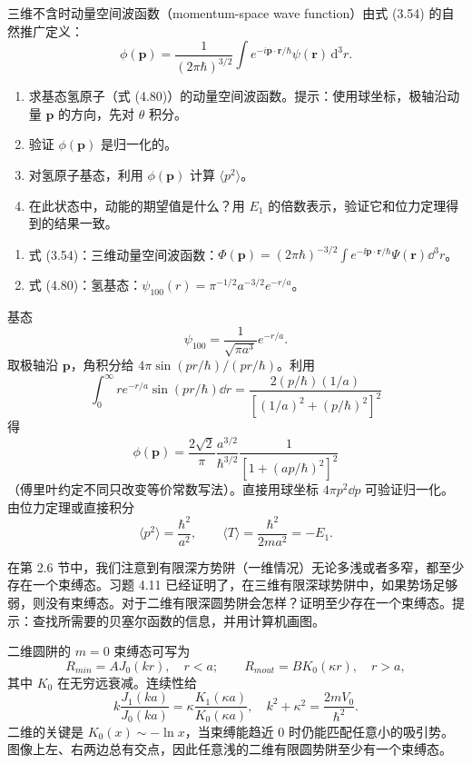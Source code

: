 \begin{question}
三维不含时动量空间波函数（momentum-space wave function）由式 (3.54) 的自然推广定义：
\[
\phi(\mathbf p)=\frac{1}{(2\pi\hbar)^{3/2}}\int e^{-i\mathbf p\cdot\mathbf r/\hbar}\psi(\mathbf r)\,\mathrm d^3r.
\]
\begin{enumerate}
\item 求基态氢原子（式 (4.80)）的动量空间波函数。提示：使用球坐标，极轴沿动量 $\mathbf p$ 的方向，先对 $\theta$ 积分。
\item 验证 $\phi(\mathbf p)$ 是归一化的。
\item 对氢原子基态，利用 $\phi(\mathbf p)$ 计算 $\langle p^2\rangle$。
\item 在此状态中，动能的期望值是什么？用 $E_1$ 的倍数表示，验证它和位力定理得到的结果一致。
\end{enumerate}

\par\smallskip
{}
\begin{enumerate}[leftmargin=2.2em,itemsep=0.12em,topsep=0.12em,parsep=0pt]
\item 式 (3.54)：三维动量空间波函数：$\Phi(\mathbf p)=(2\pi\hbar)^{-3/2}\int e^{-\ii\mathbf p\cdot\mathbf r/\hbar}\Psi(\mathbf r)\dd^3r$。
\item 式 (4.80)：氢基态：$\psi_{100}(r)=\pi^{-1/2}a^{-3/2}e^{-r/a}$。
\end{enumerate}

\end{question}
\begin{solution}

基态
\[
\psi_{100}=\frac{1}{\sqrt{\pi a^3}}e^{-r/a}.
\]
取极轴沿 $\mathbf p$，角积分给 $4\pi\sin(pr/\hbar)/(pr/\hbar)$。利用
\[
\int_0^\infty r e^{-r/a}\sin(pr/\hbar)\dd r=\frac{2(p/\hbar)(1/a)}{[(1/a)^2+(p/\hbar)^2]^2}
\]
得
\[
\phi(\mathbf p)=\frac{2\sqrt2}{\pi}\frac{a^{3/2}}{\hbar^{3/2}}\frac{1}{\left[1+(ap/\hbar)^2\right]^2}
\]
（傅里叶约定不同只改变等价常数写法）。直接用球坐标 $4\pi p^2\dd p$ 可验证归一化。由位力定理或直接积分
\[
\langle p^2\rangle=\frac{\hbar^2}{a^2},
\qquad
\langle T\rangle=\frac{\hbar^2}{2ma^2}=-E_1.
\]

\end{solution}

\begin{question}
在第 2.6 节中，我们注意到有限深方势阱（一维情况）无论多浅或者多窄，都至少存在一个束缚态。习题 4.11 已经证明了，在三维有限深球势阱中，如果势场足够弱，则没有束缚态。对于二维有限深圆势阱会怎样？证明至少存在一个束缚态。提示：查找所需要的贝塞尔函数的信息，并用计算机画图。
\end{question}
\begin{solution}

二维圆阱的 $m=0$ 束缚态可写为
\[
R_{
m in}=AJ_0(kr),\quad r<a;
\qquad
R_{
m out}=BK_0(\kappa r),\quad r>a,
\]
其中 $K_0$ 在无穷远衰减。连续性给
\[
k\frac{J_1(ka)}{J_0(ka)}=\kappa\frac{K_1(\kappa a)}{K_0(\kappa a)},
\quad k^2+\kappa^2=\frac{2mV_0}{\hbar^2}.
\]
二维的关键是 $K_0(x)\sim-\ln x$，当束缚能趋近 0 时仍能匹配任意小的吸引势。图像上左、右两边总有交点，因此任意浅的二维有限圆势阱至少有一个束缚态。

\end{solution}

